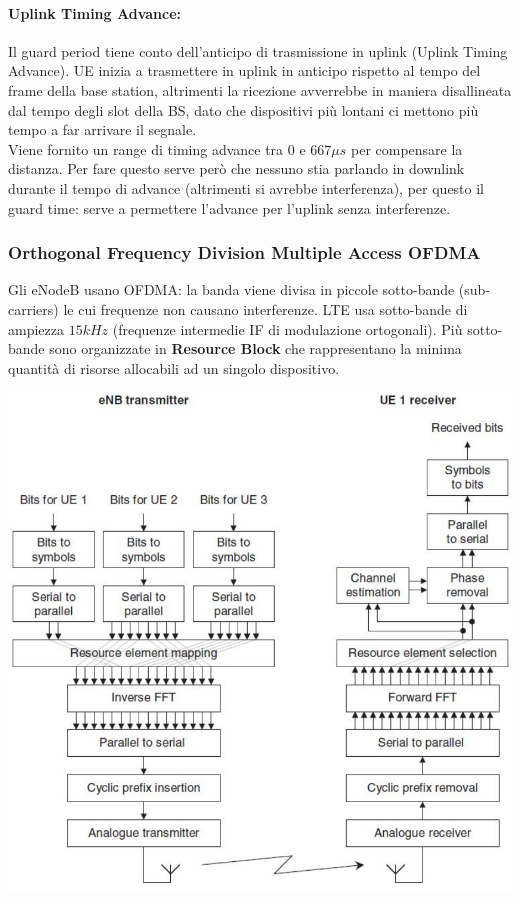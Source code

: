 \paragraph{Uplink Timing Advance:} Il guard period tiene conto dell'anticipo di trasmissione in uplink (Uplink Timing Advance). UE inizia a trasmettere in uplink in anticipo rispetto al tempo del frame della base station, altrimenti la ricezione avverrebbe in maniera disallineata dal tempo degli slot della BS, dato che dispositivi più lontani ci mettono più tempo a far arrivare il segnale. \\

Viene fornito un range di timing advance tra $0$ e $667\mu s$ per compensare la distanza. Per fare questo serve però che nessuno stia parlando in downlink durante il tempo di advance (altrimenti si avrebbe interferenza), per questo il guard time: serve a permettere l'advance per l'uplink senza interferenze.\\

\newpage

\subsubsection{Orthogonal Frequency Division Multiple Access OFDMA}

Gli eNodeB usano OFDMA: la banda viene divisa in piccole sotto-bande (sub-carriers) le cui frequenze non causano interferenze. LTE usa sotto-bande di ampiezza $15 kHz$ (frequenze intermedie IF di modulazione ortogonali). Più sotto-bande sono organizzate in \textbf{Resource Block} che rappresentano la minima quantità di risorse allocabili ad un singolo dispositivo.

\begin{center}
	\includegraphics[width=0.75\linewidth]{img/mobile/utranofdma}
\end{center}

